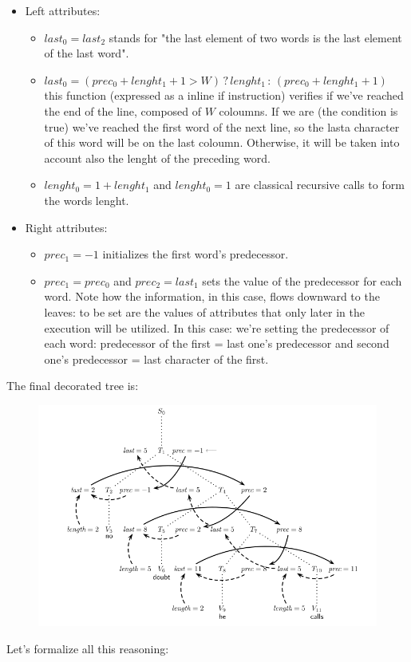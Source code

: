 				\begin{itemize}
					\item Left attributes:
					\begin{itemize}
						\item $last_0 = last_2$ stands for "the last element of two words is the last element of the last word".
						\item $last_0 = (prec_0 + lenght_1 + 1 > W) \,?\, lenght_1 \,:\, (prec_0 + lenght_1 + 1)$ this function (expressed as a inline if instruction) 
						verifies if we've reached the end of the line, composed of $W$ coloumns. If we are (the condition is true) we've reached the first word of the 
						next line, so the lasta character of this word will be on the last coloumn. Otherwise, it will be taken into account also the lenght of the 
						preceding word.
						\item  $lenght_0 = 1 + lenght_1$ and $lenght_0 = 1$ are classical recursive calls to form the words lenght.
					\end{itemize}
					\item Right attributes:
						\begin{itemize}
							\item $prec_1 = -1$ initializes the first word's predecessor.
							\item $prec_1 = prec_0$ and $prec_2 = last_1$ sets the value of the predecessor for each word. Note how the information, in this case, 
							flows downward to the leaves: to be set are the values of attributes that only later in the execution will be utilized. In this case: 
							we're setting the predecessor of each word: predecessor of the first = last one's predecessor and second one's predecessor = last 
							character of the first.
						\end{itemize}
				\end{itemize}
				The final decorated tree is:
				\begin{figure}[H]
					\includegraphics[width = \textwidth]{./images/decTree.png}
				\end{figure}
				Let's formalize all this reasoning:
			
